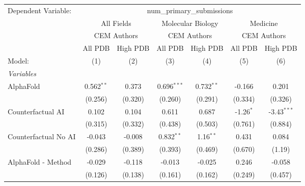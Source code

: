 \begingroup
\centering
\begin{tabular}{lcccccc}
   \tabularnewline \midrule \midrule
   Dependent Variable: & \multicolumn{6}{c}{num\_primary\_submissions}\\
 & \multicolumn{2}{c}{All Fields} & \multicolumn{2}{c}{Molecular Biology} & \multicolumn{2}{c}{Medicine} \\
\cmidrule(lr){2-3} \cmidrule(lr){4-5} \cmidrule(lr){6-7}
 & \multicolumn{2}{c}{CEM Authors} & \multicolumn{2}{c}{CEM Authors} & \multicolumn{2}{c}{CEM Authors} \\
\cmidrule(lr){2-3} \cmidrule(lr){4-5} \cmidrule(lr){6-7}
 & \multicolumn{1}{c}{All PDB} & \multicolumn{1}{c}{High PDB} & \multicolumn{1}{c}{All PDB} & \multicolumn{1}{c}{High PDB} & \multicolumn{1}{c}{All PDB} & \multicolumn{1}{c}{High PDB} \\
\cmidrule(lr){2-2} \cmidrule(lr){3-3} \cmidrule(lr){4-4} \cmidrule(lr){5-5} \cmidrule(lr){6-6} \cmidrule(lr){7-7}
   Model:                                                     & (1)           & (2)     & (3)           & (4)           & (5)          & (6)\\  
   \midrule
   \emph{Variables}\\
   AlphaFold                                                  & 0.562$^{**}$  & 0.373   & 0.696$^{***}$ & 0.732$^{**}$  & -0.166       & 0.201\\   
                                                              & (0.256)       & (0.320) & (0.260)       & (0.291)       & (0.334)      & (0.326)\\   
   Counterfactual AI                                          & 0.102         & 0.104   & 0.611         & 0.687         & -1.26$^{*}$  & -3.43$^{***}$\\   
                                                              & (0.315)       & (0.332) & (0.438)       & (0.503)       & (0.761)      & (0.884)\\   
   Counterfactual No AI                                       & -0.043        & -0.008  & 0.832$^{**}$  & 1.16$^{**}$   & 0.431        & 0.084\\   
                                                              & (0.286)       & (0.389) & (0.393)       & (0.469)       & (0.670)      & (1.19)\\   
   AlphaFold - Method                                         & -0.029        & -0.118  & -0.013        & -0.025        & 0.246        & -0.058\\   
                                                              & (0.126)       & (0.138) & (0.161)       & (0.162)       & (0.249)      & (0.457)\\   

\end{tabular}
